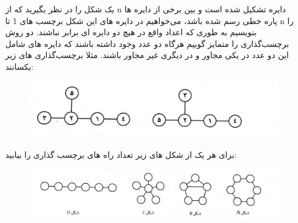 \p
یک شکل را در نظر بگیرید که از n دایره تشکیل شده است و بین برخی از دایره ها پاره خطی رسم شده باشد، می‌خواهیم در دایره های این شکل برچسب های 1 تا n را بنویسیم 
به طوری که اعداد واقع در هیچ دو دایره ای برابر نباشند. دو روش برچسب‌گذاری را متمایز گوییم هرگاه دو عدد وجود داشته باشند که دایره های شامل این دو عدد در یکی مجاور و در دیگری غیر مجاور باشند.
مثلا برچسب‌گذاری های زیر یکسانند:

\begin{figure}[h]
\centering
\includegraphics[scale = 0.18]{./figure B.jpg}
\label{fig:mesh2}
\end{figure}

برای هر یک از شکل های زیر تعداد راه های برچسب گذاری را بیابید:

\begin{figure}[h]
\centering
\includegraphics[scale = 0.16]{./figure C.JPEG}
\label{fig:mesh3}
\end{figure}